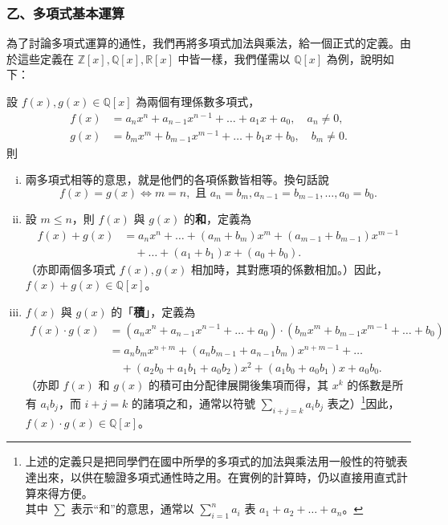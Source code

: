 \subsubsection*{乙、多項式基本運算}\label{subsec:5-2-b}

為了討論多項式運算的通性，我們再將多項式加法與乘法，給一個正式的定義。由於這些定義在 $\mathbb{Z}[x], \mathbb{Q}[x], \mathbb{R}[x]$ 中皆一樣，我們僅需以 $\mathbb{Q}[x]$ 為例，說明如下：

\begin{definition*}
設 $f(x), g(x) \in \mathbb{Q}[x]$ 為兩個有理係數多項式，
\begin{align*}
  f(x) &= a_n x^n + a_{n-1} x^{n-1} + \dots + a_1 x + a_0, \quad a_n \neq 0, \\
  g(x) &= b_m x^m + b_{m-1} x^{m-1} + \dots + b_1 x + b_0, \quad b_m \neq 0.
\end{align*}
則
\begin{enumerate}[(i)]
  \item 兩多項式相等的意思，就是他們的各項係數皆相等。換句話說
  \begin{equation*}
    f(x)=g(x) \iff m=n, \text{ 且 } a_n=b_m, a_{n-1}=b_{m-1}, \dots, a_0=b_0.
  \end{equation*}

  \item 設 $m \le n$，則 $f(x)$ 與 $g(x)$ 的\textbf{和}，定義為
  \begin{align*}
    f(x)+g(x) &= a_n x^n + \dots + (a_m+b_m)x^m + (a_{m-1}+b_{m-1})x^{m-1} \\
    &\quad + \dots + (a_1+b_1)x + (a_0+b_0).
  \end{align*}
  （亦即兩個多項式 $f(x), g(x)$ 相加時，其對應項的係數相加。）因此，$f(x)+g(x) \in \mathbb{Q}[x]$。

  \item $f(x)$ 與 $g(x)$ 的「\textbf{積}」，定義為
  \begin{align*}
    f(x) \cdot g(x) &= (a_n x^n + a_{n-1} x^{n-1} + \dots + a_0) \cdot (b_m x^m + b_{m-1} x^{m-1} + \dots + b_0) \\
    &= a_n b_m x^{n+m} + (a_n b_{m-1} + a_{n-1} b_m) x^{n+m-1} + \dots \\
    &\quad + (a_2 b_0 + a_1 b_1 + a_0 b_2) x^2 + (a_1 b_0 + a_0 b_1) x + a_0 b_0.
  \end{align*}
  （亦即 $f(x)$ 和 $g(x)$ 的積可由分配律展開後集項而得，其 $x^k$ 的係數是所有 $a_i b_j$，而 $i+j=k$ 的諸項之和，通常以符號 $\sum_{i+j=k} a_i b_j$ 表之）\footnote{上述的定義只是把同學們在國中所學的多項式的加法與乘法用一般性的符號表達出來，以供在驗證多項式通性時之用。在實例的計算時，仍以直接用直式計算來得方便。\\
  其中 $\sum$ 表示“和”的意思，通常以 $\sum_{i=1}^n a_i$ 表 $a_1+a_2+\dots+a_n$。}因此，$f(x) \cdot g(x) \in \mathbb{Q}[x]$。
\end{enumerate}
\end{definition*}

